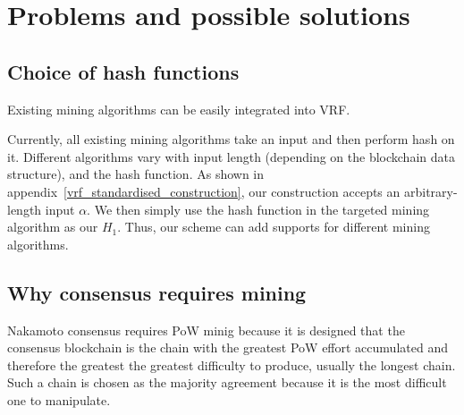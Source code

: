 \section{Problems and possible solutions}



\subsection{Choice of hash functions}


Existing mining algorithms can be easily integrated into VRF.

Currently, all existing mining algorithms take an input and then perform hash on it. Different algorithms vary with input length (depending on the blockchain data structure), and the hash function.
As shown in appendix~\ref{vrf_standardised_construction}, our construction accepts an arbitrary-length input $\alpha$.
We then simply use the hash function in the targeted mining algorithm as our $H_{1}$.
Thus, our scheme can add supports for different mining algorithms.


\subsection{Why consensus requires mining}

Nakamoto consensus requires PoW minig because it is designed that the consensus blockchain is the chain with the greatest PoW effort accumulated and therefore the greatest the greatest difficulty to produce, usually the longest chain.
Such a chain is chosen as the majority agreement because it is the most difficult one to manipulate.

